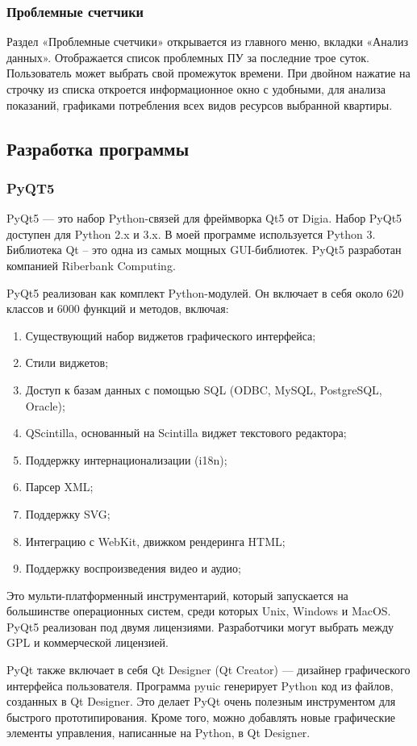 \subsubsection{Проблемные счетчики}
Раздел «Проблемные счетчики» открывается из главного меню, вкладки «Анализ данных». Отображается список проблемных ПУ за последние трое суток. Пользователь может выбрать свой промежуток времени. При двойном нажатие на строчку из списка откроется информационное окно с удобными, для анализа показаний, графиками потребления всех видов ресурсов выбранной квартиры. 
\subsection{Разработка программы}
\subsubsection{PyQT5}
PyQt5 --- это набор Python-связей для фреймворка Qt5 от Digia. Набор PyQt5 доступен для Python 2.x и 3.x. В моей программе используется Python 3. Библиотека Qt – это одна из самых мощных GUI-библиотек. PyQt5 разработан компанией Riberbank Computing.\cite{Python}

PyQt5 реализован как комплект Python-модулей. Он включает в себя около 620 классов и 6000 функций и методов, включая:
\begin{enumerate}
	\item Существующий набор виджетов графического интерфейса;
	\item Стили виджетов;
	\item Доступ к базам данных с помощью SQL (ODBC, MySQL, PostgreSQL, Oracle);
	\item QScintilla, основанный на Scintilla виджет текстового редактора;
	\item Поддержку интернационализации (i18n);
	\item Парсер XML;
	\item Поддержку SVG;
	\item Интеграцию с WebKit, движком рендеринга HTML;
	\item Поддержку воспроизведения видео и аудио;
\end{enumerate}
Это мульти-платформенный инструментарий, который запускается на большинстве операционных систем, среди которых Unix, Windows и MacOS. PyQt5 реализован под двумя лицензиями. Разработчики могут выбрать между GPL и коммерческой лицензией.

PyQt также включает в себя Qt Designer (Qt Creator) — дизайнер графического интерфейса пользователя. Программа pyuic генерирует Python код из файлов, созданных в Qt Designer. Это делает PyQt очень полезным инструментом для быстрого прототипирования. Кроме того, можно добавлять новые графические элементы управления, написанные на Python, в Qt Designer.\cite{PyQt5}

